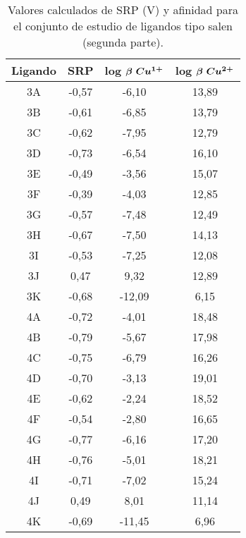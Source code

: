 \clearpage

\begin{table}[h]
\centering
\caption{Valores calculados de SRP (V) y afinidad para el conjunto de estudio de ligandos tipo salen (segunda parte).}
\begin{tabular}{c|ccc}
\hline
\textbf{Ligando} & \textbf{SRP} & \textbf{log $\boldsymbol{\beta$ $Cu^{1+}}$} & \textbf{log $\boldsymbol{\beta$ $Cu^{2+}}$} \\ \hline
3A               & -0,57        & -6,10                & 13,89                 \\
3B               & -0,61        & -6,85                & 13,79                 \\
3C               & -0,62        & -7,95                & 12,79                 \\
3D               & -0,73        & -6,54                & 16,10                 \\
3E               & -0,49        & -3,56                & 15,07                 \\
3F               & -0,39        & -4,03                & 12,85                 \\
3G               & -0,57        & -7,48                & 12,49                 \\
3H               & -0,67        & -7,50                & 14,13                 \\
3I               & -0,53        & -7,25                & 12,08                 \\
3J               & 0,47         & 9,32                 & 12,89                 \\
3K               & -0,68        & -12,09               & 6,15                  \\
4A               & -0,72        & -4,01                & 18,48                 \\
4B               & -0,79        & -5,67                & 17,98                 \\
4C               & -0,75        & -6,79                & 16,26                 \\
4D               & -0,70        & -3,13                & 19,01                 \\
4E               & -0,62        & -2,24                & 18,52                 \\
4F               & -0,54        & -2,80                & 16,65                 \\
4G               & -0,77        & -6,16                & 17,20                 \\
4H               & -0,76        & -5,01                & 18,21                 \\
4I               & -0,71        & -7,02                & 15,24                 \\
4J               & 0,49         & 8,01                 & 11,14                 \\
4K               & -0,69        & -11,45               & 6,96                  \\ \hline
\end{tabular}
\end{table}